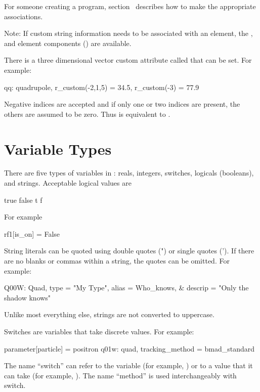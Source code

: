 {{For someone creating a program, section~ describes how
to make the appropriate associations.

Note: If custom string information needs to be associated with an
element, the ,  and  element components
() are available.

There is a three dimensional vector custom attribute called  that can be set.
For example:
\begin{example}
  qq: quadrupole, r_custom(-2,1,5) = 34.5, r_custom(-3) = 77.9
\end{example}
Negative indices are accepted and if only one or two indices are present, the others
are assumed to be zero. Thus  is equivalent to .

\section{Variable Types}
\label{s:var.types}

There are five types of variables in \bmad: reals, integers, switches,
logicals (booleans), and strings. Acceptable logical values are
\begin{example}
   true    false
   t       f
\end{example}
For example
\begin{example}
  rf1[is_on] = False
\end{example}

String literals can be quoted using double quotes (") or single quotes ('). 
If there are no
blanks or commas within a string, the quotes can be omitted. For example:
\begin{example}
  Q00W: Quad, type = "My Type", alias = Who_knows, &
                                  descrip = "Only the shadow knows"
\end{example}
Unlike most everything else, strings are not converted to uppercase.

Switches are variables that take discrete values. For example:
\begin{example}
  parameter[particle] = positron          
  q01w: quad, tracking_method = bmad_standard 
\end{example}
The name ``switch'' can refer to the variable (for example,
) or to a value that it can take (for example,
). The name ``method'' is used interchangeably with switch.

}}
